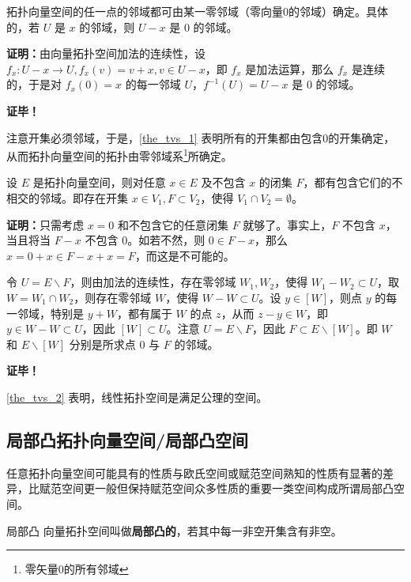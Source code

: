 \begin{theorem}{}\label{the_tvs_1}
拓扑向量空间的任一点的邻域都可由某一零邻域（零向量0的邻域）确定。具体的，若 $U$ 是 $x$ 的邻域，则 $U-x$ 是 $0$ 的邻域。
\end{theorem}

\textbf{证明：}由向量拓扑空间加法的连续性，设 $f_x:U-x\rightarrow U,f_x(v)=v+x,v\in U-x$，即 $f_x$ 是加法运算，那么 $f_x$ 是连续的，于是对 $f_x(0)=x$ 的每一邻域 $U$，$f^{-1}(U)=U-x$ 是 $0$ 的邻域。

\textbf{证毕！}

注意开集必须邻域，于是，\autoref{the_tvs_1} 表明所有的开集都由包含0的开集确定，从而拓扑向量空间的拓扑由零邻域系\footnote{零矢量0的所有邻域}所确定。

\begin{theorem}{}\label{the_tvs_2}
设 $E$ 是拓扑向量空间，则对任意 $x\in E$ 及不包含 $x$ 的闭集 $F$，都有包含它们的不相交的邻域。即存在开集 $x\in V_1,F\subset V_2$，使得 $V_1\cap V_2=\emptyset$。
\end{theorem}

\textbf{证明：}只需考虑 $x=0$ 和不包含它的任意闭集 $F$ 就够了。事实上，$F$ 不包含 $x$，当且将当 $F-x$ 不包含 0。如若不然，则 $0\in F-x$，那么 $x=0+x\in F-x+x=F$，而这是不可能的。

令 $U=E\backslash F$，则由加法的连续性，存在零邻域 $W_1,W_2$，使得 $W_1-W_2\subset U$，取 $W=W_1\cap W_2$，则存在零邻域 $W$，使得 $W-W\subset U$。设 $y\in [W]$，则点 $y$ 的每一邻域，特别是 $y+W$，都有属于 $W$ 的点 $z$，从而 $z-y\in W$，即 $y\in W-W\subset U$，因此 $[W]\subset U$。注意 $U=E\backslash F$，因此 $F\subset E\backslash [W]$。即 $W$ 和 $E\backslash [W]$ 分别是所求点 $0$ 与 $F$ 的邻域。

\textbf{证毕！}

\autoref{the_tvs_2} 表明，线性拓扑空间是满足公理的空间。





\subsection{局部凸拓扑向量空间/局部凸空间}
任意拓扑向量空间可能具有的性质与欧氏空间或赋范空间熟知的性质有显著的差异，比赋范空间更一般但保持赋范空间众多性质的重要一类空间构成所谓局部凸空间。


\begin{definition}{局部凸}
向量拓扑空间叫做\textbf{局部凸的}，若其中每一非空开集含有非空。
\end{definition}

